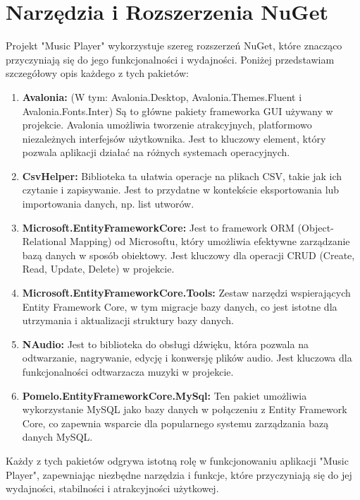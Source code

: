 \section{Narzędzia i Rozszerzenia NuGet}

Projekt "Music Player" wykorzystuje szereg rozszerzeń NuGet, które znacząco przyczyniają się do jego funkcjonalności i wydajności. Poniżej przedstawiam szczegółowy opis każdego z tych pakietów:

\begin{enumerate}
    \item \textbf{ Avalonia:} (W tym: Avalonia.Desktop, Avalonia.Themes.Fluent i  Avalonia.Fonts.Inter) Są to główne pakiety frameworka GUI używany w projekcie. Avalonia umożliwia tworzenie atrakcyjnych, platformowo niezależnych interfejsów użytkownika. Jest to kluczowy element, który pozwala aplikacji działać na różnych systemach operacyjnych.
    \item \textbf{ CsvHelper:} Biblioteka ta ułatwia operacje na plikach CSV, takie jak ich czytanie i zapisywanie. Jest to przydatne w kontekście eksportowania lub importowania danych, np. list utworów.
    \item \textbf{Microsoft.EntityFrameworkCore:} Jest to framework ORM (Object-Relational Mapping) od Microsoftu, który umożliwia efektywne zarządzanie bazą danych w sposób obiektowy. Jest kluczowy dla operacji CRUD (Create, Read, Update, Delete) w projekcie.
    
    \item \textbf{Microsoft.EntityFrameworkCore.Tools:} Zestaw narzędzi wspierających Entity Framework Core, w tym migracje bazy danych, co jest istotne dla utrzymania i aktualizacji struktury bazy danych.
    
    \item \textbf{NAudio:} Jest to biblioteka do obsługi dźwięku, która pozwala na odtwarzanie, nagrywanie, edycję i konwersję plików audio. Jest kluczowa dla funkcjonalności odtwarzacza muzyki w projekcie.
    
    \item \textbf{Pomelo.EntityFrameworkCore.MySql:} Ten pakiet umożliwia wykorzystanie MySQL jako bazy danych w połączeniu z Entity Framework Core, co zapewnia wsparcie dla popularnego systemu zarządzania bazą danych MySQL.
\end{enumerate}

Każdy z tych pakietów odgrywa istotną rolę w funkcjonowaniu aplikacji "Music Player", zapewniając niezbędne narzędzia i funkcje, które przyczyniają się do jej wydajności, stabilności i atrakcyjności użytkowej.

